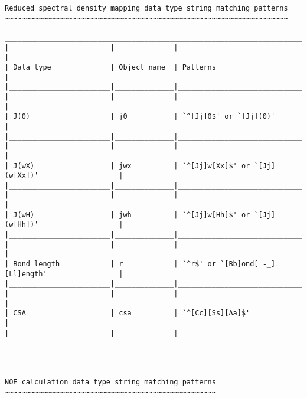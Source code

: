 {\begin{verbatim}
Reduced spectral density mapping data type string matching patterns
~~~~~~~~~~~~~~~~~~~~~~~~~~~~~~~~~~~~~~~~~~~~~~~~~~~~~~~~~~~~~~~~~~~

____________________________________________________________________________________________
|                        |              |                                                  |
| Data type              | Object name  | Patterns                                         |
|________________________|______________|__________________________________________________|
|                        |              |                                                  |
| J(0)                   | j0           | `^[Jj]0$' or `[Jj](0)'                           |
|________________________|______________|__________________________________________________|
|                        |              |                                                  |
| J(wX)                  | jwx          | `^[Jj]w[Xx]$' or `[Jj](w[Xx])'                   |
|________________________|______________|__________________________________________________|
|                        |              |                                                  |
| J(wH)                  | jwh          | `^[Jj]w[Hh]$' or `[Jj](w[Hh])'                   |
|________________________|______________|__________________________________________________|
|                        |              |                                                  |
| Bond length            | r            | `^r$' or `[Bb]ond[ -_][Ll]ength'                 |
|________________________|______________|__________________________________________________|
|                        |              |                                                  |
| CSA                    | csa          | `^[Cc][Ss][Aa]$'                                 |
|________________________|______________|__________________________________________________|




NOE calculation data type string matching patterns
~~~~~~~~~~~~~~~~~~~~~~~~~~~~~~~~~~~~~~~~~~~~~~~~~~


\end{verbatim}}
